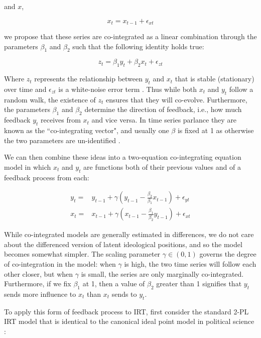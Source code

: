 \documentclass[12pt]{article}
\begin{document}
and $x$,

\begin{equation}
x_t = x_{t-1} + \epsilon_{xt}
\end{equation}

we propose that these series are co-integrated as a linear combination through the parameters $\beta_1$ and $\beta_2$ such that the following identity holds true:

\begin{equation}
z_t = \beta_1 y_t + \beta_2 x_t + \epsilon_{zt}
\end{equation}

Where $z_t$ represents the relationship between $y_t$ and $x_t$ that is stable (stationary) over time and $\epsilon_{zt}$ is a white-noise error term \parencite[253]{engle1987}. Thus while both $x_t$ and $y_t$ follow a random walk, the existence of $z_t$ ensures that they will co-evolve. Furthermore, the parameters $\beta_1$ and $\beta_2$ determine the direction of feedback, i.e., how much feedback $y_t$ receives from $x_t$ and vice versa. In time series parlance they are known as the ``co-integrating vector", and usually one $\beta$ is fixed at 1 as otherwise the two parameters are un-identified \parencite[253]{timeseries2014}. 

We can then combine these ideas into a two-equation co-integrating equation model in which $x_t$ and $y_t$ are functions both of their previous values and of a feedback process from each:

\begin{align}
 y_t =& y_{t-1} + \gamma (y_{t-1} - \frac{\beta_2}{\beta_1}x_{t-1}) + \epsilon_{yt}\\
  x_t =& x_{t-1} + \gamma (x_{t-1} - \frac{\beta_1}{\beta_2}y_{t-1}) + \epsilon_{xt}
\end{align}

While co-integrated models are generally estimated in differences, we do not care about the differenced version of latent ideological positions, and so the model becomes somewhat simpler. The scaling parameter $\gamma \in (0,1)$ governs the degree of co-integration in the model: when $\gamma$ is high, the two time series will follow each other closer, but when $\gamma$ is small, the series are only marginally co-integrated. Furthermore, if we fix $\beta_1$ at 1, then a value of $\beta_2$ greater than 1 signifies that $y_t$ sends more influence to $x_t$ than $x_t$ sends to $y_t$. 

To apply this form of feedback process to IRT, first consider the standard 2-PL IRT model that is identical to the canonical ideal point model in political science \parencite{jackman2004}:
\end{document}
